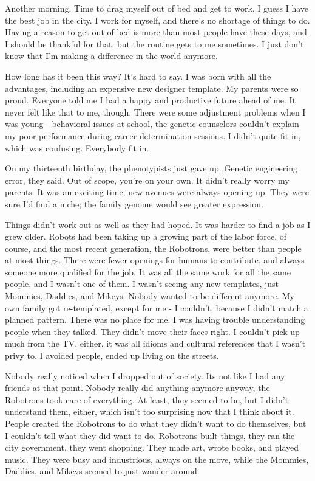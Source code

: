 \documentclass{amsbook}
\begin{document}
Another morning.  Time to drag myself out of bed and get to work. I guess I have the best job in the city.  I work for myself, and there's no shortage of things to do.  Having a reason to get out of bed is more than most people have these days, and I should be thankful for that, but the routine gets to me sometimes.  I just don't know that I'm making a difference in the world anymore.

How long has it been this way?  It's hard to say.  I was born with all the advantages, including an expensive new designer template.  My parents were so proud.  Everyone told me I had a happy and productive future ahead of me.  It never felt like that to me, though.  There were some adjustment problems when I was young - behavioral issues at school, the genetic counselors couldn't explain my poor performance during career determination sessions.  I didn't quite fit in, which was confusing.  Everybody fit in.

On my thirteenth birthday, the phenotypists just gave up.  Genetic engineering error, they said.  Out of scope, you're on your own.  It didn't really worry my parents.  It was an exciting time, new avenues were always opening up.  They were sure I'd find a niche; the family genome would see greater expression.

Things didn't work out as well as they had hoped.  It was harder to find a job as I grew older.  Robots had been taking up a growing part of the labor force, of course, and the most recent generation, the Robotrons, were better than people at most things.  There were fewer openings for humans to contribute, and always someone more qualified for the job.  It was all the same work for all the same people, and I wasn't one of them.  I wasn't seeing any new templates, just Mommies, Daddies, and Mikeys.  Nobody wanted to be different anymore.  My own family got re-templated, except for me - I couldn't, because I didn't match a planned pattern.  There was no place for me.  I was having trouble understanding people when they talked.  They didn't move their faces right.  I couldn't pick up much from the TV, either, it was all idioms and cultural references that I wasn't privy to.  I avoided people, ended up living on the streets.

Nobody really noticed when I dropped out of society.  Its not like I had any friends at that point.  Nobody really did anything anymore anyway, the Robotrons took care of everything.  At least, they seemed to be, but I didn't understand them, either, which isn't too surprising now that I think about it.  People created the Robotrons to do what they didn't want to do themselves, but I couldn't tell what they did want to do.  Robotrons built things, they ran the city government, they went shopping.  They made art, wrote books, and played music.  They were busy and industrious, always on the move, while the Mommies, Daddies, and Mikeys seemed to just wander around.
\end{document}

